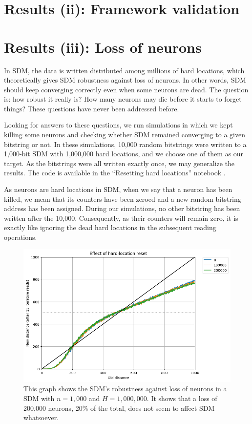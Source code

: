 \chapter{Results (ii): Framework validation}



\chapter{Results (iii): Loss of neurons}
In SDM, the data is written distributed among millions of hard locations, which theoretically gives SDM robustness against loss of neurons. In other words, SDM should keep converging correctly even when some neurons are dead. The question is: how robust it really is? How many neurons may die before it starts to forget things? These questions have never been addressed before.

Looking for answers to these questions, we run simulations in which we kept killing some neurons and checking whether SDM remained converging to a given bitstring or not. In these simulations, 10,000 random bitstrings were written to a 1,000-bit SDM with 1,000,000 hard locations, and we choose one of them as our target. As the bitstrings were all written exactly once, we may generalize the results. The code is available in the ``Resetting hard locations'' notebook \citep{sdmframework}.

As neurons are hard locations in SDM, when we say that a neuron has been killed, we mean that its counters have been zeroed and a new random bitstring address has been assigned. During our simulations, no other bitstring has been written after the 10,000. Consequently, as their counters will remain zero, it is exactly like ignoring the dead hard locations in the subsequent reading operations.

\begin{figure}[!p]
\centering\includegraphics[width=\textwidth]{./images02/new-images/sdm-neuron-death-200k.png}
\caption{This graph shows the SDM's robustness against loss of neurons in a SDM with $n=1,000$ and $H=1,000,000$. It shows that a loss of 200,000 neurons, 20\% of the total, does not seem to affect SDM whatsoever.
\label{fig:sdm-neuron-death-200k}}
\end{figure}

